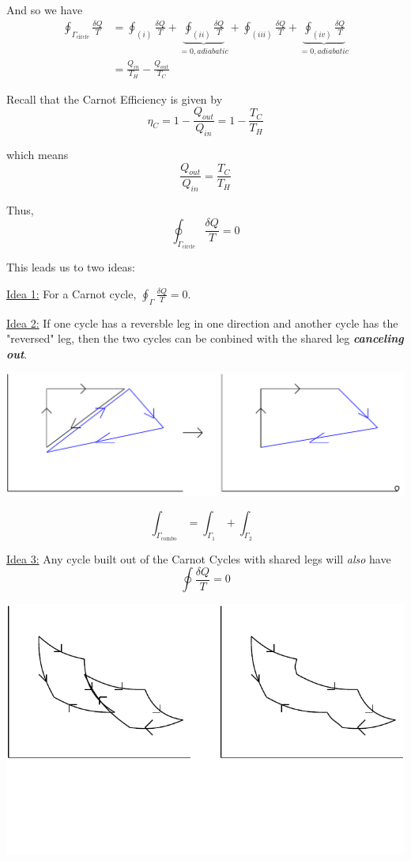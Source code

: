 \documentclass{article}
\begin{document}
And so we have 
\begin{align*}
  \oint_{{\Gamma_{\text{circle}}}} \frac{\delta Q}{T} &= \oint_{(i)} \frac{\delta Q}{T} + \underbrace{\oint_{(ii)} \frac{\delta Q}{T}}_{= 0, adiabatic} + \oint_{(iii)} \frac{\delta Q}{T} + \underbrace{\oint_{(iv)} \frac{\delta Q}{T}}_{= 0, adiabatic} \\
  &= \frac{Q_{in}}{T_H} - \frac{Q_{out}}{T_C}
\end{align*}

Recall that the Carnot Efficiency is given by 
\[ \eta_{C} = 1 - \frac{Q_{out}}{Q_{in}} = 1 - \frac{T_C}{T_H} \]

which means \[ \frac{Q_{out}}{Q_{in}} = \frac{T_C}{T_H}  \]

Thus, 
\[ \boxed{\oint_{{\Gamma_{\text{circle}}}} \frac{\delta Q}{T}  = 0} \]

\vskip 0.5cm
This leads us to two ideas:

\vskip 0.5cm
\underline{Idea 1:} For a Carnot cycle, $\oint_{\Gamma} \frac{\delta Q}{T}  = 0$.

\vskip 0.5cm
\underline{Idea 2:} If one cycle has a reversble leg in one direction and another cycle has the "reversed" leg, then the two cycles can be conbined with the shared leg \emph{\textbf{canceling out}}.

\vskip 0.5cm
\begin{center}
  \includegraphics*[scale=0.40]{feb7_reversible_legs.png}
\end{center}

\[ \int_{{\Gamma_{\text{combo}}}} = \int_{{\Gamma_{\text{1}}}} + \int_{{\Gamma_{\text{2}}}} \]

\vskip 0.5cm
\underline{Idea 3:} Any cycle built out of the Carnot Cycles with shared legs will \emph{also} have 
\[ \oint \frac{\delta Q}{T} = 0 \]
\vskip 0.5cm
\begin{center}
  \includegraphics*[scale=0.40]{112 Feb 7 Carnot Combine.png}
\end{center}
\end{document}
